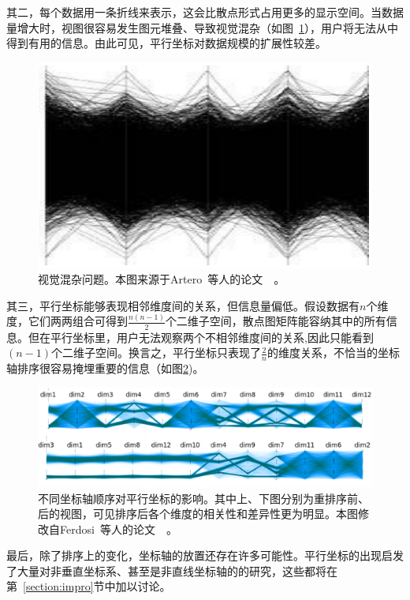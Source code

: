 \documentclass[12pt,twocolumn]{article}
\begin{document}
其二，每个数据用一条折线来表示，这会比散点形式占用更多的显示空间。当数据量增大时，视图很容易发生图元堆叠、导致视觉混杂（如图~\ref{fig:PC_clutter}），用户将无法从中得到有用的信息。由此可见，平行坐标对数据规模的扩展性较差。

\begin{figure}[!htb]
\centering
\includegraphics[width=0.8\linewidth]{images/PC_clutter.eps}
\caption{\label{fig:PC_clutter}视觉混杂问题。本图来源于Artero~等人的论文~\citep{artero2004uncovering}~。
}
\end{figure}

其三，平行坐标能够表现相邻维度间的关系，但信息量偏低。假设数据有$n$个维度，它们两两组合可得到$\frac{n(n-1)}{2}$个二维子空间，散点图矩阵能容纳其中的所有信息。但在平行坐标里，用户无法观察两个不相邻维度间的关系,因此只能看到$(n-1)$个二维子空间。换言之，平行坐标只表现了$\frac{2}{n}$的维度关系，不恰当的坐标轴排序很容易掩埋重要的信息（如图\ref{fig:PC_reordering})。

\begin{figure}[!htb]
\centering
\includegraphics[width=1.0\linewidth]{images/PC_reordering.eps}
\caption{\label{fig:PC_reordering}不同坐标轴顺序对平行坐标的影响。其中上、下图分别为重排序前、后的视图，可见排序后各个维度的相关性和差异性更为明显。本图修改自Ferdosi~等人的论文~\citep{ferdosi2011visualizing}~。
}
\end{figure}

最后，除了排序上的变化，坐标轴的放置还存在许多可能性。平行坐标的出现启发了大量对非垂直坐标系、甚至是非直线坐标轴的的研究，这些都将在第~\ref{section:impro}节中加以讨论。
\end{document}
